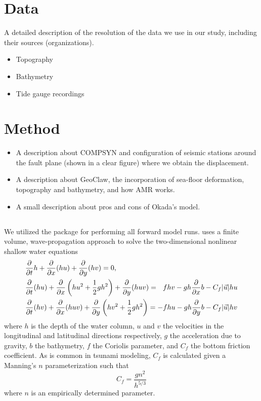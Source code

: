 \documentclass[preprint,review,12pt]{elsarticle}
\begin{document}
\section{Data}

A detailed description of the resolution of the data we use in our study, including their sources (organizations).
\begin{itemize}
  \item Topography
  \item Bathymetry
  \item Tide gauge recordings
\end{itemize}

\section{Method}
 
\begin{itemize}
  \item A description about COMPSYN and configuration of seismic stations around the fault plane (shown in a clear figure) where we obtain the displacement.
  \item A description about GeoClaw, the incorporation of sea-floor deformation, topography and bathymetry, and how AMR works.
   \item A small description about pros and cons of Okada's model.
\end{itemize}

\subsection{\geoclaw}

We utilized the \geoclaw package for performing all forward model runs.  \geoclaw uses a finite volume, wave-propagation approach to solve the two-dimensional nonlinear shallow water equations
\begin{equation} \label{eq:swe}
    \begin{aligned}
    &\frac{\partial }{\partial t} h + \frac{\partial }{\partial x} (hu) + \frac{\partial }{\partial y} (hv) = 0, \\
    &\frac{\partial }{\partial t}(hu) + \frac{\partial }{\partial x} \left(hu^2 + \frac{1}{2} g h^2 \right ) + \frac{\partial }{\partial y} (huv) = ~~ fhv - gh \frac{\partial }{\partial x} b - C_f |\vec{u}| hu \\
    &\frac{\partial }{\partial t} (hv) + \frac{\partial }{\partial x} (huv) + \frac{\partial }{\partial y} \left (hv^2 + \frac{1}{2} gh^2 \right) = -fhu - gh \frac{\partial }{\partial y} b - C_f |\vec{u}| hv
    \end{aligned}
\end{equation}
where $h$ is the depth of the water column, $u$ and $v$ the velocities in the longitudinal and latitudinal directions respectively, $g$ the acceleration due to gravity, $b$ the bathymetry, $f$ the Coriolis parameter, and $C_f$ the bottom friction coefficient.  As is common in tsunami modeling, $C_f$ is calculated given a Manning's $n$ parameterization such that
\begin{equation}
    C_f = \frac{g n^2}{h^{5/3}}
\end{equation}
where $n$ is an empirically determined parameter.
\end{document}
